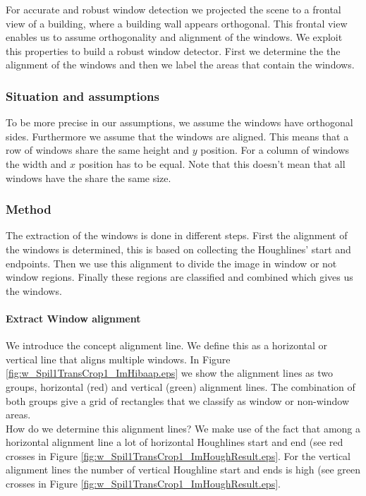 For accurate and robust window detection we projected the scene to a frontal
view of a building, where a building wall appears orthogonal. This frontal
view enables us to assume orthogonality and alignment of the windows. We
exploit this properties to build a robust window detector.
First we determine the the alignment of the windows and
then we label the areas that contain the windows. 


\subsubsection{Situation and assumptions}
To be more precise in our assumptions, we assume the windows have orthogonal sides.  Furthermore we
assume that the windows are aligned. This means that a row of windows share the
same height and $y$ position. For a column of windows the width and $x$
position has to be equal.  Note that this doesn't mean that all windows have the
share the same size.

\subsubsection{Method}
The extraction of the windows is done in different steps. 
First the alignment of the windows is determined, this is based on collecting
the Houghlines' start and endpoints. Then we use this alignment to divide the
image in window or not window regions.  Finally these regions are classified
and combined which gives us the windows.


\paragraph{Extract Window alignment}
We introduce the concept alignment line. We define this as a horizontal or
vertical line that aligns multiple windows. In Figure
\ref{fig:w_Spil1TransCrop1_ImHibaap.eps}
we show the alignment lines as two groups, horizontal (red) and
vertical (green) alignment lines.  The combination of both groups give a grid of
rectangles that we classify as window or non-window areas.\\

How do we determine this alignment lines? We make use of the fact that among a
horizontal alignment line a lot of horizontal Houghlines start and end (see red
crosses in Figure \ref{fig:w_Spil1TransCrop1_ImHoughResult.eps}. For the vertical alignment lines
the number of vertical Houghline start and ends is high (see green crosses in
Figure \ref{fig:w_Spil1TransCrop1_ImHoughResult.eps}.\\

